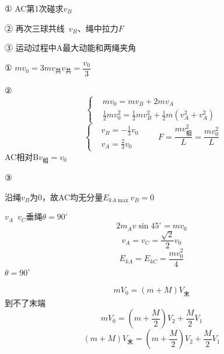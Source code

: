 \begin{problem}

① AC第1次碰\quad 求$v_B$

② 再次三球共线\ $v_B$、绳中拉力$F$

③ 运动过程中A最大动能和两绳夹角
\begin{solution}
① $mv_0=3mv_{\text{共}}$\quad $v_{\text{共}}=\dfrac{v_0}{3}$

② \[
\left\{\begin{aligned}
&mv_0=mv_B+2mv_A\\
&\frac{1}{2}mv_0^2=\frac{1}{2}mv_B^2+\frac{1}{2}m\left(v_A^2+v_A^2\right)
\end{aligned}\right.
\]
\[
\left\{\begin{aligned}
&v_B=-\frac{1}{3}v_0\\
&v_A=\frac{2}{3}v_0
\end{aligned}\right.
\qquad
F=\frac{m v_{\text{相}}^2}{L}=\frac{mv_0^2}{L}
\]
AC相对B\quad $v_{\text{相}}=v_0$

③

沿绳$v_B$为0，故AC均无分量\quad $E_{kA\max}$\quad $v_B=0$

$v_A$\ $v_C$垂绳\quad $\theta=90^\circ$
\[ 2m_Av\sin 45^\circ=mv_0 \]%
\[ v_A=v_C=\frac{\sqrt{2}}{2}v_0 \]
\[ E_{kA}=E_{kC}=\frac{mv_0^2}{4} \]
$\theta=90^\circ$ %
\end{solution}
\end{problem}
\[ mV_0=(m+M)V_{\text{末}} \]
到不了末端
\[ mV_0=\left(m+\dfrac{M}{2}\right)V_2+\dfrac{M}{2}V_1 \]
\[ (m+M)V_{\text{末}}=\left(m+\dfrac{M}{2}\right)V_2+\dfrac{M}{2}V_1 \]
